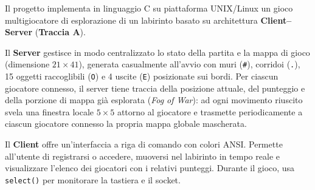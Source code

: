 \documentclass[11pt,a4paper]{article}
\begin{document}
Il progetto implementa in linguaggio C su piattaforma UNIX/Linux un gioco multigiocatore di esplorazione di un labirinto basato su architettura \textbf{Client--Server} (\textbf{Traccia A}).

Il \textbf{Server} gestisce in modo centralizzato lo stato della partita e la mappa di gioco (dimensione $21 \times 41$), generata casualmente all'avvio con muri (\texttt{\#}), corridoi (\texttt{.}), 15 oggetti raccoglibili (\texttt{O}) e 4 uscite (\texttt{E}) posizionate sui bordi. Per ciascun giocatore connesso, il server tiene traccia della posizione attuale, del punteggio e della porzione di mappa già esplorata (\textit{Fog of War}): ad ogni movimento riuscito svela una finestra locale $5 \times 5$ attorno al giocatore e trasmette periodicamente a ciascun giocatore connesso la propria mappa globale mascherata.

Il \textbf{Client} offre un'interfaccia a riga di comando con colori ANSI. Permette all'utente di registrarsi o accedere, muoversi nel labirinto in tempo reale e visualizzare l'elenco dei giocatori con i relativi punteggi. Durante il gioco, usa \texttt{select()} per monitorare la tastiera e il socket.
\end{document}
